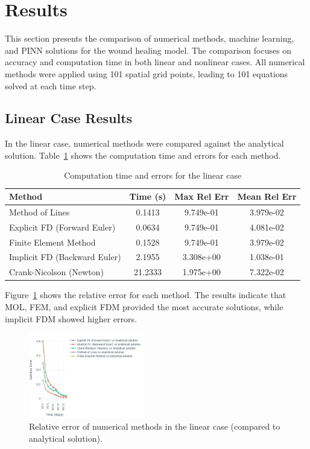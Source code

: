 \documentclass[conference]{IEEEtran}
\begin{document}
\section{Results}

This section presents the comparison of numerical methods, machine learning, and PINN solutions for the wound healing model. The comparison focuses on accuracy and computation time in both linear and nonlinear cases.
All numerical methods were applied using 101 spatial grid points, leading to 101 equations solved at each time step.
\subsection{Linear Case Results}
In the linear case, numerical methods were compared against the analytical solution. Table~\ref{tab:linear_results} shows the computation time and errors for each method.
\begin{table}[h!]
\centering
\footnotesize %
\caption{Computation time and errors for the linear case}
\label{tab:linear_results}
\begin{tabular}{@{}lccc@{}}
\toprule
\textbf{Method} & \textbf{Time (s)} & \textbf{Max Rel Err} & \textbf{Mean Rel Err} \\
\midrule
Method of Lines & 0.1413 & 9.749e-01 & 3.979e-02 \\
Explicit FD (Forward Euler) & 0.0634 & 9.749e-01 & 4.081e-02 \\
Finite Element Method & 0.1528 & 9.749e-01 & 3.979e-02 \\
Implicit FD (Backward Euler) & 2.1955 & 3.308e+00 & 1.038e-01 \\
Crank-Nicolson (Newton) & 21.2333 & 1.975e+00 & 7.322e-02 \\
\bottomrule
\end{tabular}
\normalsize
\end{table}


Figure~\ref{fig:accuracy_linear} shows the relative error for each method. The results indicate that MOL, FEM, and explicit FDM provided the most accurate solutions, while implicit FDM showed higher errors.


\begin{figure}[h!]
\centering
\includegraphics[width=0.45\textwidth]{linear.jpg} %
\caption{Relative error of numerical methods in the linear case (compared to analytical solution).}
\label{fig:accuracy_linear}
\end{figure}
\end{document}
